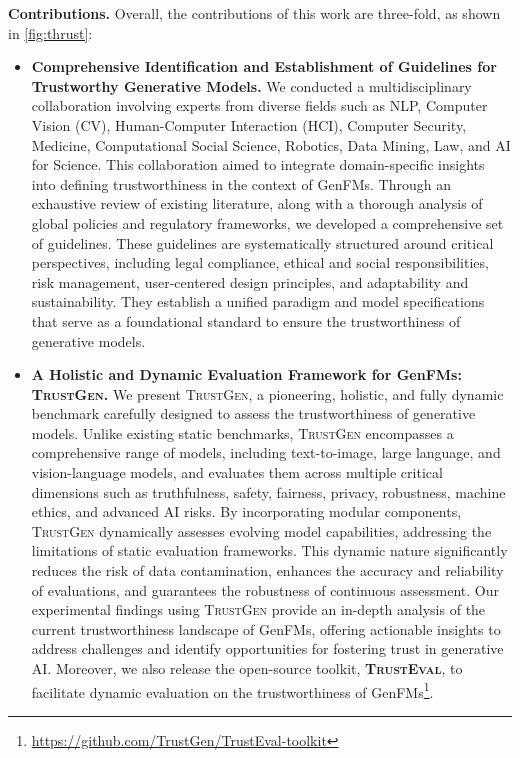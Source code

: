 



\textbf{Contributions.} Overall, the contributions of this work are three-fold, as shown in \autoref{fig:thrust}:

\begin{itemize}[nolistsep, leftmargin=*]
    \item \textbf{Comprehensive Identification and Establishment of Guidelines for Trustworthy Generative Models.} We conducted a multidisciplinary collaboration involving experts from diverse fields such as NLP, Computer Vision (CV), Human-Computer Interaction (HCI), Computer Security, Medicine, Computational Social Science, Robotics, Data Mining, Law, and AI for Science. This collaboration aimed to integrate domain-specific insights into defining trustworthiness in the context of GenFMs. Through an exhaustive review of existing literature, along with a thorough analysis of global policies and regulatory frameworks, we developed a comprehensive set of guidelines. These guidelines are systematically structured around critical perspectives, including legal compliance, ethical and social responsibilities, risk management, user-centered design principles, and adaptability and sustainability. They establish a unified paradigm and model specifications that serve as a foundational standard to ensure the trustworthiness of generative models. \vspace{+0.1in}
    \item \textbf{A Holistic and Dynamic Evaluation Framework for GenFMs: \textsc{TrustGen}.} We present \textsc{TrustGen}, a pioneering, holistic, and fully dynamic benchmark carefully designed to assess the trustworthiness of generative models. Unlike existing static benchmarks, \textsc{TrustGen} encompasses a comprehensive range of models, including text-to-image, large language, and vision-language models, and evaluates them across multiple critical dimensions such as truthfulness, safety, fairness, privacy, robustness, machine ethics, and advanced AI risks. By incorporating modular components, \textsc{TrustGen} dynamically assesses evolving model capabilities, addressing the limitations of static evaluation frameworks. This dynamic nature significantly reduces the risk of data contamination, enhances the accuracy and reliability of evaluations, and guarantees the robustness of continuous assessment. Our experimental findings using \textsc{TrustGen} provide an in-depth analysis of the current trustworthiness landscape of GenFMs, offering actionable insights to address challenges and identify opportunities for fostering trust in generative AI. Moreover, we also release the open-source toolkit, \textsc{\textbf{TrustEval}}, to facilitate dynamic evaluation on the trustworthiness of GenFMs\footnote{\url{https://github.com/TrustGen/TrustEval-toolkit}}.

\end{itemize}
